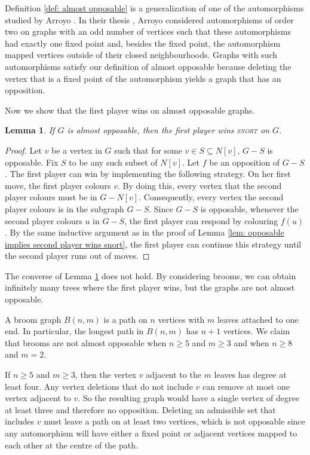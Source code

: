 \documentclass[11pt]{article}
\newtheorem{lemma}[theorem]{Lemma}
\theoremstyle{definition}
\begin{document}
Definition \ref{def: almost opposable} is a generalization of one of the
automorphisms studied by Arroyo \cite{arroyo:dawsons}. In their thesis
\cite{arroyo:dawsons}, Arroyo considered automorphisms of order two on graphs
with an odd number of vertices such that these automorphisms had exactly one
fixed point and, besides the fixed point, the automorphism mapped vertices
outside of their closed neighbourhoods. Graphs with such automorphisms satisfy
our definition of almost opposable because deleting the vertex that is a fixed
point of the automorphism yields a graph that has an opposition. 

Now we show that the first player wins on almost opposable graphs. 

\begin{lemma}
    \label{lem: a.o. implies 1st player win}
    If $G$ is almost opposable, then the first player wins \textsc{snort} on
    $G$.
\end{lemma}

\begin{proof}
    Let $v$ be a vertex in $G$ such that for some $v\in S\subseteq N[v]$, $G-S$
    is opposable. Fix $S$ to be any such subset of $N[v]$. Let $f$ be an
    opposition of $G-S$. The first player can win by implementing the following
    strategy. On her first move, the first player colours $v$. By doing this,
    every vertex that the second player colours must be in $G-N[v]$.
    Consequently, every vertex the second player colours is in the subgraph
    $G-S$. Since $G-S$ is opposable, whenever the second player colours $u$ in
    $G-S$, the first player can respond by colouring $f(u)$. By the same
    inductive argument as in the proof of Lemma \ref{lem: opposable implies
    second player wins snort}, the first player can continue this strategy
    until the second player runs out of moves. 
\end{proof}

The converse of Lemma \ref{lem: a.o. implies 1st player win} does not hold. By
considering brooms, we can obtain infinitely many trees where the first player
wins, but the graphs are not almost opposable.

A broom graph $B(n,m)$ is a path on $n$ vertices with $m$ leaves attached to
one end. In particular, the longest path in $B(n,m)$ has $n+1$ vertices. We
claim that brooms are not almost opposable when $n\geq5$ and $m\geq3$ and when
$n\geq8$ and $m=2$.

If $n\geq5$ and $m\geq3$, then the vertex $v$ adjacent to the $m$ leaves has
degree at least four. Any vertex deletions that do not include $v$ can remove
at most one vertex adjacent to $v$. So the resulting graph would have a single
vertex of degree at least three and therefore no opposition. Deleting an
admissible set that includes $v$ must leave a path on at least two vertices,
which is not opposable since any automorphism will have either a fixed point or
adjacent vertices mapped to each other at the centre of the path.
\end{document}
